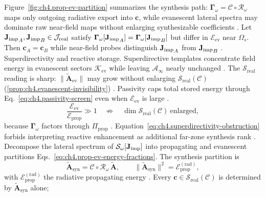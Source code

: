 Figure~\ref{fig:ch4.prop-ev-partition} summarizes the synthesis path: $\boldsymbol{\Gamma}_\omega=\mathcal{C}\circ\mathcal{R}_\omega$
maps only outgoing radiative export into $\mathbf{c}$, while evanescent lateral spectra may dominate raw near-field maps
without enlarging synthesizable coefficients \cite{stratton1941,devaney2004}.
\label{cor:ch4.reactive-no-c}
Let \({\mathbf{J}_{\mathrm{imp}}}_{A},{\mathbf{J}_{\mathrm{imp}}}_{B}\in\mathcal{J}_{\mathrm{real}}\) satisfy
\(\boldsymbol{\Gamma}_\omega[{\mathbf{J}_{\mathrm{imp}}}_{A}]=\boldsymbol{\Gamma}_\omega[{\mathbf{J}_{\mathrm{imp}}}_{B}]\) but differ in
\(\mathcal{E}_{\mathrm{ev}}\) near \(\Omega_{s}\). Then \(\mathbf{c}_{A}=\mathbf{c}_{B}\) while near-field probes
distinguish \({\mathbf{J}_{\mathrm{imp}}}_{A}\) from \({\mathbf{J}_{\mathrm{imp}}}_{B}\) \cite{stratton1941}.
Superdirectivity and reactive storage. Superdirective templates concentrate field energy in evanescent sectors \(\mathcal{K}_{\mathrm{ev}}\) while leaving
\(\mathcal{A}_{\infty}\) nearly unchanged \cite{stratton1941}. The $\mathcal{S}_{\mathrm{real}}$ reading is
sharp: \(\|\widetilde{\mathbf{A}}_{\mathrm{ev}}\|\) may grow without enlarging \(\mathcal{S}_{\mathrm{real}}(\mathcal{C})\)
(\ref{prop:ch4.evanescent-invisibility}) \cite{devaney2004}. Passivity caps total stored energy through
Eq.~\eqref{eq:ch4.passivity-screen} even when \(\mathcal{E}_{\mathrm{ev}}\) is large \cite{stratton1941}.
\begin{equation}
\label{eq:ch4.superdirectivity-obstruction}
\frac{\mathcal{E}_{\mathrm{ev}}}{\mathcal{E}_{\mathrm{prop}}}
\gg1
\quad\not\Longrightarrow\quad
\dim\mathcal{S}_{\mathrm{real}}(\mathcal{C})\ \text{enlarged},
\end{equation}
because \(\boldsymbol{\Gamma}_\omega\) factors through \(\Pi_{\mathrm{prop}}\) \cite{harrington2001}.
Equation~\eqref{eq:ch4.superdirectivity-obstruction} forbids interpreting reactive enhancement as additional far-zone
synthesis rank \cite{hansen1988}.
Decompose the lateral spectrum of \(\mathcal{S}_\omega[\mathbf{J}_{\mathrm{imp}}]\) into propagating and evanescent partitions
Eqs.~\eqref{eq:ch4.prop-ev-energy-fractions}. The synthesis partition is
\begin{equation}
\label{eq:ch4.synthesis-spectrum-partition}
\widetilde{\mathbf{A}}_{\mathrm{syn}}
=
\mathcal{C}\circ\mathcal{R}_\omega\,\widetilde{\mathbf{A}},
\qquad
\|\widetilde{\mathbf{A}}_{\mathrm{syn}}\|^{2}
=
\mathcal{E}_{\mathrm{prop}}^{\mathrm{(rad)}},
\end{equation}
with \(\mathcal{E}_{\mathrm{prop}}^{\mathrm{(rad)}}\) the radiative propagating energy \cite{stratton1941}.
Every \(\mathbf{c}\in\mathcal{S}_{\mathrm{real}}(\mathcal{C})\) is determined by \(\widetilde{\mathbf{A}}_{\mathrm{syn}}\) alone;
